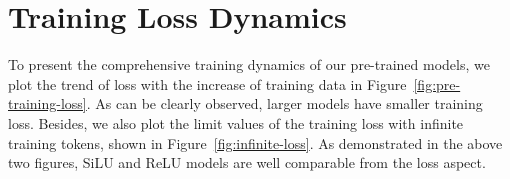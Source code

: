 \documentclass{article} %
\begin{document}



\clearpage

\appendix
\section{Training Loss Dynamics} \label{sec:training-loss}

To present the comprehensive training dynamics of our pre-trained models, we plot the trend of loss with the increase of training data in Figure~\ref{fig:pre-training-loss}. As can be clearly observed, larger models have smaller training loss. Besides, we also plot the limit values of the training loss with infinite training tokens, shown in Figure~\ref{fig:infinite-loss}. As demonstrated in the above two figures, SiLU and ReLU models are well comparable from the loss aspect.
\end{document}
